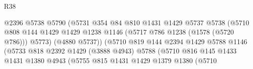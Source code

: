 \begin{lexlean}{R38}
\begin{coremodule}
                                            @2396
                                            @5738
                                            @5790
                                            (@5731
                                              @354
                                              @84
                                              @810
                                              @1431
                                              @1429
                                              @5737
                                              @5738
                                              (@5710
                                                @808
                                                @144
                                                @1429
                                                @1429
                                                @1238
                                                @1146
                                                (@5717 @786 @1238 (@1578 (@5720 @786)))
                                                @5773)
                                              (@4880 @5737))
                                            (@5710
                                              @819
                                              @144
                                              @2394
                                              @1429
                                              @5788
                                              @1146
                                              (@5733
                                                @818
                                                @2392
                                                @1429
                                                (@3888 @4943)
                                                @5788
                                                (@5710
                                                  @816
                                                  @145
                                                  @1433
                                                  @1431
                                                  @1380
                                                  @4943
                                                  (@5755
                                                    @815
                                                    @1431
                                                    @1429
                                                    @1379
                                                    @1380
                                                    (@5710

\end{coremodule}
\end{lexlean}

